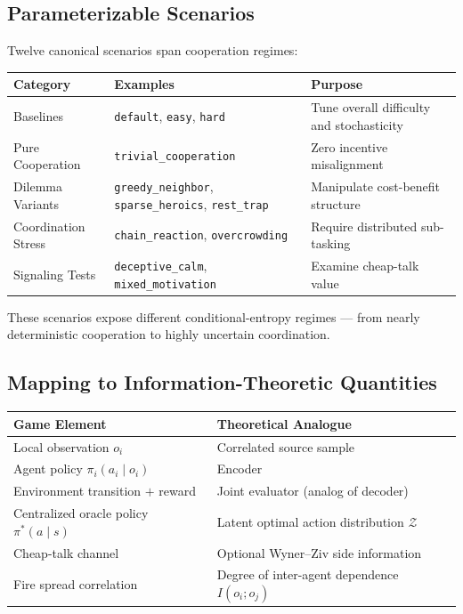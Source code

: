 \documentclass[10pt, letterpaper]{article}
\begin{document}
\subsection{Parameterizable Scenarios}

Twelve canonical scenarios span cooperation regimes:

\begin{center}
\begin{tabular}{lll}
\toprule
\textbf{Category} & \textbf{Examples} & \textbf{Purpose} \\
\midrule
Baselines & \texttt{default}, \texttt{easy}, \texttt{hard} & Tune overall difficulty and stochasticity \\
Pure Cooperation & \texttt{trivial\_cooperation} & Zero incentive misalignment \\
Dilemma Variants & \texttt{greedy\_neighbor}, \texttt{sparse\_heroics}, \texttt{rest\_trap} & Manipulate cost-benefit structure \\
Coordination Stress & \texttt{chain\_reaction}, \texttt{overcrowding} & Require distributed sub-tasking \\
Signaling Tests & \texttt{deceptive\_calm}, \texttt{mixed\_motivation} & Examine cheap-talk value \\
\bottomrule
\end{tabular}
\end{center}

These scenarios expose different conditional-entropy regimes --- from nearly deterministic cooperation to highly uncertain coordination.

\subsection{Mapping to Information-Theoretic Quantities}

\begin{center}
\begin{tabular}{ll}
\toprule
\textbf{Game Element} & \textbf{Theoretical Analogue} \\
\midrule
Local observation $o_i$ & Correlated source sample \\
Agent policy $\pi_i(a_i \mid o_i)$ & Encoder \\
Environment transition $+$ reward & Joint evaluator (analog of decoder) \\
Centralized oracle policy $\pi^*(a \mid s)$ & Latent optimal action distribution $\mathcal{Z}$ \\
Cheap-talk channel & Optional Wyner--Ziv side information \\
Fire spread correlation & Degree of inter-agent dependence $I(o_i; o_j)$ \\
\bottomrule
\end{tabular}
\end{center}
\end{document}
